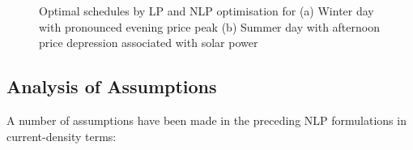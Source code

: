 \documentclass[preprint,3p,review,authoryear,10pt]{elsarticle}
\begin{document}
\begin{figure}[!ht]
\centering
{}
\caption{Optimal schedules by LP and NLP optimisation for (a) Winter day with pronounced evening price peak (b) Summer day with afternoon price depression associated with solar power}
\end{figure}


\subsection{Analysis of Assumptions}
\label{analysis_of_assumptions}
A number of assumptions have been made in the preceding NLP formulations in current-density terms:
\end{document}
